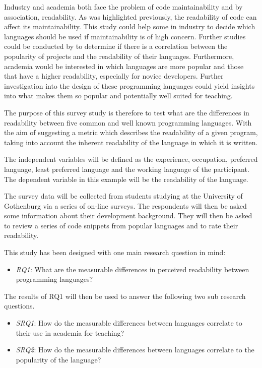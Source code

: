 \documentclass[times, 10pt,twocolumn]{Article}
\begin{document}


Industry and academia both face the problem of code maintainability and by association, readability. As was highlighted previously, the readability of code can affect its maintainability. This study could help some in industry to decide which languages should be used if maintainability is of high concern. Further studies could be conducted by to determine if there is a correlation between the popularity of projects and the readability of their languages. Furthermore, academia would be interested in which languages are more popular and those that have a higher readability, especially for novice developers. Further investigation into the design of these programming languages could yield insights into what makes them so popular and potentially well suited for teaching.

The purpose of this survey study is therefore to test what are the differences in readability between five common and well known programming languages. With the aim of suggesting a metric which describes the readability of a given program, taking into account the inherent readability of the language in which it is written.

The independent variables will be defined as the experience, occupation, preferred language, least preferred language and the working language of the participant. The dependent variable in this example will be the readability of the language.

The survey data will be collected from students studying at the University of Gothenburg via a series of on-line surveys. The respondents will then be asked some information about their development background. They will then be asked to review a series of code snippets from popular languages and to rate their readability. 

This study has been designed with one main research question in mind:
\begin{itemize}
\item \textit{RQ1:} What are the measurable differences in perceived readability between programming languages?
\end{itemize}


The results of RQ1 will then be used to answer the following two sub research questions. 
\begin{itemize}
\item \textit{SRQ1}: How do the measurable differences between languages correlate to their use in academia for teaching?
\item \textit{SRQ2}: How do the measurable differences between languages correlate to the popularity of the language?
\end{itemize}
\end{document}
